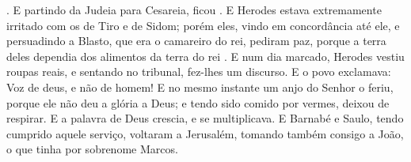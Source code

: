 {{} . E partindo da Judeia para Cesareia, ficou
{} .
E Herodes estava extremamente irritado com os de Tiro e de Sidom; porém eles, vindo em concordância até ele, e persuadindo a Blasto, que era o camareiro do rei, pediram paz, porque a terra deles dependia dos alimentos da terra do rei
{} .
E num dia marcado, Herodes vestiu roupas reais, e sentando no tribunal, fez-lhes um discurso.
E o povo exclamava: Voz de deus, e não de homem!
E no mesmo instante um anjo do Senhor o feriu, porque ele não deu a glória a Deus; e tendo sido comido por vermes, deixou de respirar.
E a palavra de Deus crescia, e se multiplicava.
E Barnabé e Saulo, tendo cumprido aquele serviço, voltaram a Jerusalém, tomando também consigo a João, o que tinha por sobrenome Marcos.

}
